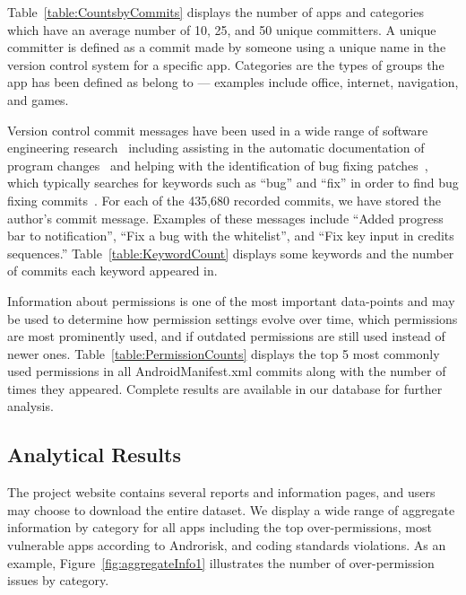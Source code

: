 \documentclass[conference]{IEEEtran}
\begin{document}
Table~\ref{table:CountsbyCommits} displays the number of apps and categories which have an average number of 10, 25, and 50 unique committers. A unique committer is defined as a commit made by someone using a unique name in the version control system for a specific app. Categories are the types of groups the app has been defined as belong to --- examples include office, internet, navigation, and games. %




Version control commit messages have been used in a wide range of software engineering research~\cite{bachmann2010missing} including assisting in the automatic documentation of program changes~\cite{Buse:2010:ADP:1858996.1859005} and helping with the identification of bug fixing patches~\cite{Dallmeier:2007:EBL:1321631.1321702}, which typically searches for keywords such as ``bug'' and ``fix'' in order to find bug fixing commits~\cite{Tian:2012:ILB:2337223.2337269}. For each of the 435,680 recorded commits, we have stored the author's commit message. Examples of these messages include ``Added progress bar to notification'', ``Fix a bug with the whitelist'',  and ``Fix key input in credits sequences.'' Table~\ref{table:KeywordCount} displays some keywords and the number of commits each keyword appeared in.

Information about permissions is one of the most important data-points and may be used to determine how permission settings evolve over time, which permissions are most prominently used, and if outdated permissions are still used instead of newer ones. Table~\ref{table:PermissionCounts} displays the top 5 most commonly used permissions in all AndroidManifest.xml commits along with the number of times they appeared. Complete results are available in our database for further analysis.

\subsection{Analytical Results}
The project website contains several reports and information pages, and users may choose to download the entire dataset. We display a wide range of aggregate information by category for all apps including the top over-permissions, most vulnerable apps according to Androrisk, and coding standards violations. As an example, Figure~\ref{fig:aggregateInfo1} illustrates the number of over-permission issues by category.
\end{document}
